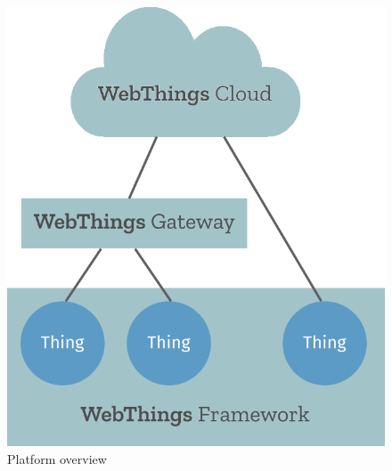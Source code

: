 \begin{figure}[H]
\centering
\includegraphics[scale=0.70]{images/webthings/webthings_block_diagram.png}
\caption{Platform overview \cite{wtabout}}
\end{figure}


